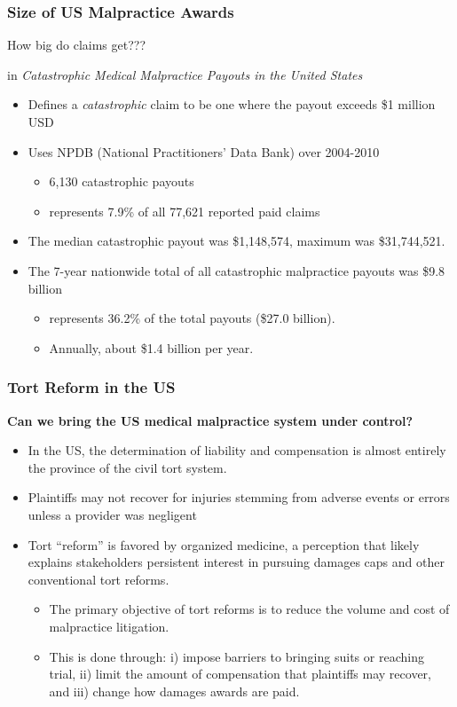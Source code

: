 \documentclass[serif,10pt]{beamer}
\begin{document}
\begin{frame}
\frametitle{Size of US Malpractice Awards}

How big do claims get???

\cite{bixenstine2014catastrophic} in {\small \textit{Catastrophic Medical Malpractice Payouts in the United States}}

  \begin{itemize}
\item Defines a \textit{catastrophic} claim to be one where the payout exceeds \$1 million USD
\item Uses NPDB (National Practitioners' Data Bank) over 2004-2010
 \begin{itemize}
\item 6,130 catastrophic payouts
\item represents 7.9\% of all 77,621 reported paid claims
\end{itemize}
\item The median catastrophic payout was \$1,148,574, maximum was \$31,744,521.
\item  The 7-year nationwide total of all catastrophic malpractice payouts was \$9.8 billion
 \begin{itemize} \item represents 36.2\% of the total payouts (\$27.0 billion).
\item Annually, about \$1.4 billion per year.
\end{itemize}
\end{itemize}
\end{frame}


\begin{frame}
\frametitle{Tort Reform in the US}
\textbf{Can we bring the US medical malpractice system under control?}

  \begin{itemize}
\item In the US, the determination of liability and compensation is almost entirely the province of the civil tort system.
\item Plaintiffs may not recover for injuries stemming from adverse events or errors unless a provider was negligent
\item Tort ``reform'' is favored by organized medicine, a perception that likely explains stakeholders persistent interest in pursuing damages caps and other conventional tort reforms.
\begin{itemize}
\item The primary objective of tort reforms is to reduce the volume and cost of malpractice litigation.
\item This is done through: i) impose barriers to bringing suits or reaching trial, ii) limit the amount of compensation that plaintiffs may recover, and iii) change how damages awards are paid.
\end{itemize}\end{itemize}
\end{frame}
\end{document}
